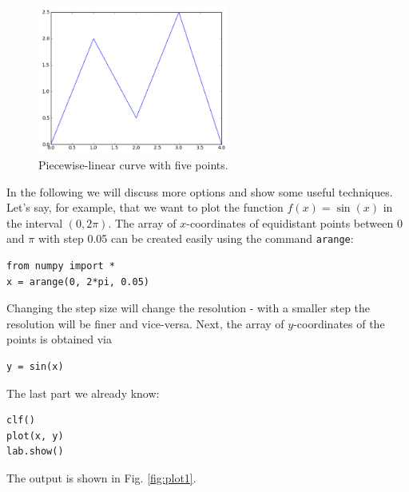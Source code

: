 \begin{figure}[!ht]
\begin{center}
\hbox{}
\hspace{-6mm}
\includegraphics[width=0.56\textwidth]{imgp/plot.png}
\end{center}
\vspace{-2mm}
\caption{Piecewise-linear curve with five points.}
\label{fig:plot}
\end{figure}
\noindent
In the following we will discuss more options and show some useful techniques.
Let's say, for example, that we want to plot the function $f(x) = \sin(x)$
in the interval $(0, 2\pi)$. The array of $x$-coordinates of equidistant points 
between 0 and $\pi$ with step 0.05 can be created easily using the command {\tt arange}:

\begin{verbatim}
from numpy import *
x = arange(0, 2*pi, 0.05)
\end{verbatim}
Changing the step size will change the resolution - with a smaller step the resolution will 
be finer and vice-versa. Next, the array of $y$-coordinates of the points is obtained via

\begin{verbatim}
y = sin(x)
\end{verbatim}
The last part we already know:

\begin{verbatim}
clf()
plot(x, y)
lab.show()
\end{verbatim}
\noindent
The output is shown in Fig. \ref{fig:plot1}.\\[-7mm]

